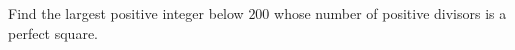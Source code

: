 Find the largest positive integer below $200$ whose number of positive divisors is a perfect square.
